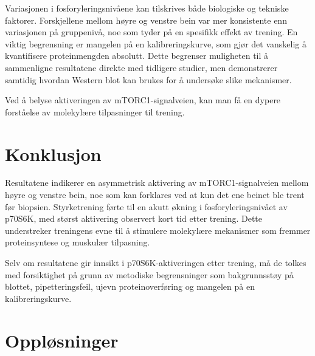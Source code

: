 \documentclass[
  letterpaper,
  DIV=11,
  numbers=noendperiod]{scrreprt}
\begin{document}
Variasjonen i fosforyleringsnivåene kan tilskrives både biologiske og
tekniske faktorer. Forskjellene mellom høyre og venstre bein var mer
konsistente enn variasjonen på gruppenivå, noe som tyder på en spesifikk
effekt av trening. En viktig begrensning er mangelen på en
kalibreringskurve, som gjør det vanskelig å kvantifisere proteinmengden
absolutt. Dette begrenser muligheten til å sammenligne resultatene
direkte med tidligere studier, men demonstrerer samtidig hvordan Western
blot kan brukes for å undersøke slike mekanismer.

Ved å belyse aktiveringen av mTORC1-signalveien, kan man få en dypere
forståelse av molekylære tilpasninger til trening.

\section{Konklusjon}\label{konklusjon-3}

Resultatene indikerer en asymmetrisk aktivering av mTORC1-signalveien
mellom høyre og venstre bein, noe som kan forklares ved at kun det ene
beinet ble trent før biopsien. Styrketrening førte til en akutt økning i
fosforyleringsnivået av p70S6K, med størst aktivering observert kort tid
etter trening. Dette understreker treningens evne til å stimulere
molekylære mekanismer som fremmer proteinsyntese og muskulær tilpasning.

Selv om resultatene gir innsikt i p70S6K-aktiveringen etter trening, må
de tolkes med forsiktighet på grunn av metodiske begrensninger som
bakgrunnsstøy på blottet, pipetteringsfeil, ujevn proteinoverføring og
mangelen på en kalibreringskurve.

\section{Oppløsninger}\label{oppluxf8sninger}
\end{document}
